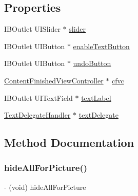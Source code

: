\subsection*{Properties}
\begin{DoxyCompactItemize}
\item 
I\+B\+Outlet U\+I\+Slider $\ast$ \hyperlink{interface_picture_editor_view_afc10700e0347203367f6ca5aaaa143a3}{slider}
\item 
I\+B\+Outlet U\+I\+Button $\ast$ \hyperlink{interface_picture_editor_view_a5f4bd87d14e0115689eb192441d272d4}{enable\+Text\+Button}
\item 
I\+B\+Outlet U\+I\+Button $\ast$ \hyperlink{interface_picture_editor_view_ad93327ee9b31ebf01e5514a3fd1a9cb1}{undo\+Button}
\item 
\hyperlink{interface_content_finished_view_controller}{Content\+Finished\+View\+Controller} $\ast$ \hyperlink{interface_picture_editor_view_a4f7a89c8a7b46f92f71f969a3a5dc14e}{cfvc}
\item 
I\+B\+Outlet U\+I\+Text\+Field $\ast$ \hyperlink{interface_picture_editor_view_a51584f852efd8bc284ffa96a617dfd0a}{text\+Label}
\item 
\hyperlink{interface_text_delegate_handler}{Text\+Delegate\+Handler} $\ast$ \hyperlink{interface_picture_editor_view_a61a2d1aa02618d35a3eb7c26e794f638}{text\+Delegate}
\end{DoxyCompactItemize}


\subsection{Method Documentation}
\hypertarget{interface_picture_editor_view_ae1284a4d906171f56f93041bf07b02fb}{}\label{interface_picture_editor_view_ae1284a4d906171f56f93041bf07b02fb} 
\subsubsection{\texorpdfstring{hide\+All\+For\+Picture()}{hideAllForPicture()}}
{\footnotesize\ttfamily -\/ (void) hide\+All\+For\+Picture \begin{DoxyParamCaption}{ }\end{DoxyParamCaption}}

\hypertarget{interface_picture_editor_view_a538b91286f6528696320d2450704f78e}{}\label{interface_picture_editor_view_a538b91286f6528696320d2450704f78e} 
